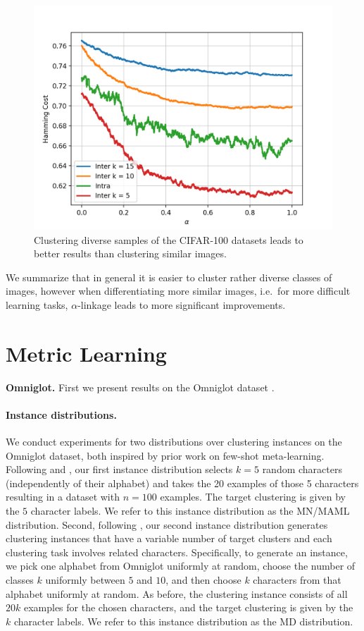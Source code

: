 \begin{figure}[H]
  \centering
  \includegraphics[width=.6\textwidth]{plots/cifar100}
  \caption{Clustering diverse samples of the CIFAR-100 datasets leads to better results than clustering similar images.}
  \label{fig:cifar100}
\end{figure}

We summarize that in general it is easier to cluster rather diverse classes of images, however when differentiating more similar images, i.e.\ for more difficult learning tasks, $\alpha$-linkage leads to more significant improvements.

\section{Metric Learning}

\medskip\noindent\textbf{Omniglot.} First we present results on the Omniglot
dataset \cite{Lake1332}.

\paragraph{Instance distributions.} We conduct experiments for two distributions
over clustering instances on the Omniglot dataset, both inspired by prior work
on few-shot meta-learning. Following \cite{NIPS2016_6385} and
\cite{pmlr-v70-finn17a}, our first instance distribution selects $k = 5$ random
characters (independently of their alphabet) and takes the 20 examples of those
5 characters resulting in a dataset with $n = 100$ examples. The target
clustering is given by the $5$ character labels. We refer to this instance
distribution as the MN/MAML distribution. Second, following
\cite{DBLP:journals/corr/abs-1903-03096}, our second instance distribution generates
clustering instances that have a variable number of target clusters and each
clustering task involves related characters. Specifically, to generate an
instance, we pick one alphabet from Omniglot uniformly at random, choose the
number of classes $k$ uniformly between $5$ and $10$, and then choose $k$
characters from that alphabet uniformly at random. As before, the clustering
instance consists of all $20k$ examples for the chosen characters, and the
target clustering is given by the $k$ character labels. We refer to this
instance distribution as the MD distribution.

